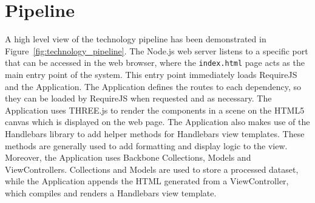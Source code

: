 \section{Pipeline} {
\label{sec:technology_pipeline}

	A high level view of the technology pipeline has been demonstrated in Figure~\ref{fig:technology_pipeline}. The Node.js web server listens to a specific port that can be accessed in the web browser, where the \texttt{index.html} page acts as the main entry point of the system. This entry point immediately loads RequireJS and the Application. The Application defines the routes to each dependency, so they can be loaded by RequireJS when requested and as necessary. The Application uses THREE.js to render the components in a scene on the HTML5 canvas which is displayed on the web page. The Application also makes use of the Handlebars library to add helper methods for Handlebars view templates. These methods are generally used to add formatting and display logic to the view. Moreover, the Application uses Backbone Collections, Models and ViewControllers. Collections and Models are used to store a processed dataset, while the Application appends the HTML generated from a ViewController, which compiles and renders a Handlebars view template.

	

}
